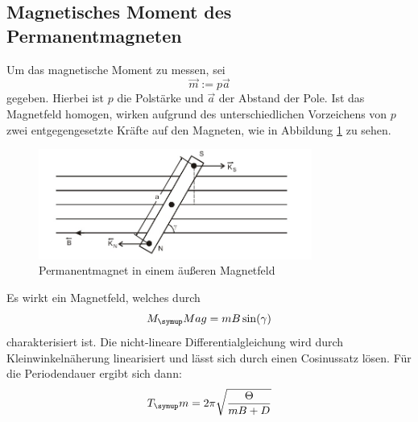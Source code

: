 \subsection{Magnetisches Moment des Permanentmagneten}
Um das magnetische Moment zu messen, sei
\begin{equation}
  \vec{m}:=p\vec{a}
\end{equation}
gegeben. Hierbei ist $p$ die Polstärke und $\vec{a}$ der Abstand der Pole. Ist das
Magnetfeld homogen, wirken aufgrund des unterschiedlichen Vorzeichens von $p$ zwei
entgegengesetzte Kräfte auf den Magneten, wie in Abbildung \ref{magnet} zu sehen.
\begin{figure}[H]
  \centering
  \includegraphics[width=0.8\textwidth]{bilder/magnet.jpg}
  \caption{Permanentmagnet in einem äußeren Magnetfeld \cite{102}}
  \label{magnet}
\end{figure}
Es wirkt ein Magnetfeld, welches durch
\begin{equation}
  M_\su{Mag}=mB\sin(\gamma)
\end{equation}
charakterisiert ist. Die nicht-lineare Differentialgleichung wird durch
Kleinwinkelnäherung linearisiert und lässt sich durch einen Cosinussatz lösen.
Für die Periodendauer ergibt sich dann:
\begin{equation}
  T_\su{m}=2\pi\sqrt{\frac{\Theta}{mB+D}}
  \label{eq:magperi}
\end{equation}
